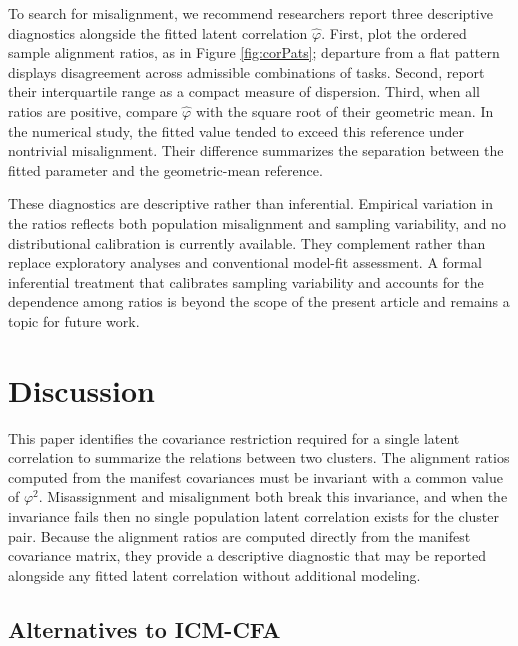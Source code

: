 \documentclass[
  american,
  man,floatsintext]{apa7}
\begin{document}
To search for misalignment, we recommend researchers report three descriptive diagnostics alongside the fitted latent correlation \(\widehat{\varphi}\). First, plot the ordered sample alignment ratios, as in Figure \ref{fig:corPats}; departure from a flat pattern displays disagreement across admissible combinations of tasks. Second, report their interquartile range as a compact measure of dispersion. Third, when all ratios are positive, compare \(\widehat{\varphi}\) with the square root of their geometric mean. In the numerical study, the fitted value tended to exceed this reference under nontrivial misalignment. Their difference summarizes the separation between the fitted parameter and the geometric-mean reference.

These diagnostics are descriptive rather than inferential. Empirical variation in the ratios reflects both population misalignment and sampling variability, and no distributional calibration is currently available. They complement rather than replace exploratory analyses and conventional model-fit assessment. A formal inferential treatment that calibrates sampling variability and accounts for the dependence among ratios is beyond the scope of the present article and remains a topic for future work.

\section{Discussion}\label{discussion}

This paper identifies the covariance restriction required for a single latent correlation to summarize the relations between two clusters. The alignment ratios computed from the manifest covariances must be invariant with a common value of \(\varphi^2\). Misassignment and misalignment both break this invariance, and when the invariance fails then no single population latent correlation exists for the cluster pair. Because the alignment ratios are computed directly from the manifest covariance matrix, they provide a descriptive diagnostic that may be reported alongside any fitted latent correlation without additional modeling.

\subsection{Alternatives to ICM-CFA}\label{alternatives-to-icm-cfa}
\end{document}
